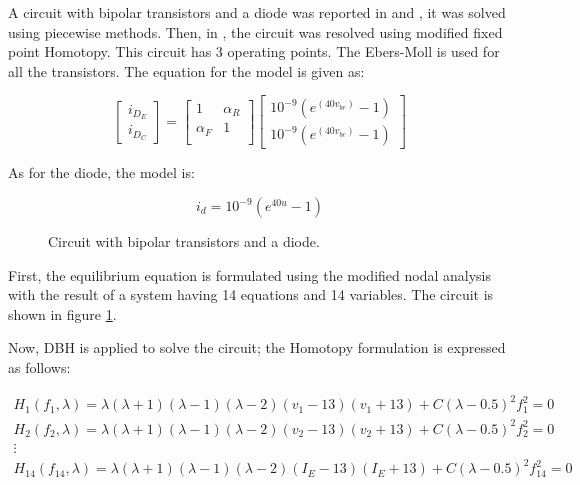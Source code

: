 \documentclass[conference,letterpaper,onecolumn]{IEEEtran}
\begin{document}
A circuit with bipolar transistors and a diode was reported in \cite{homo_tadeusiewicz} and  \cite{homo_yamamurawise}, it was solved using piecewise methods. Then, in \cite{homo_yamamura}, the circuit was resolved using modified fixed point Homotopy. This circuit has 3 operating points. The Ebers-Moll is used for all the transistors. The equation for the model is given as:

\begin{displaymath}
\left[ \begin{array}{c}
i_{D_E} \\
i_{D_C}
\end{array}\right] =
\left[ \begin{array}{cc} 1  & \alpha_R \\
\alpha_F & 1 \\
\end{array}\right] \left[ \begin{array}{c}
10^{-9}(e^{(40v_{be})} - 1) \\
10^{-9}(e^{(40v_{bc})} - 1)
\end{array}\right]
\end{displaymath}

As for the diode, the model is:

\begin{displaymath}
i_d=10^{-9}(e^{40u} - 1)
\end{displaymath}

\begin{figure}[hbtp]
\centerline{
\epsfxsize=95mm
\hspace{3mm}
\epsfxsize=30mm
}
\caption{Circuit with bipolar transistors and a diode.}
\label{yamamuracircuito}
\end{figure}

First, the equilibrium equation is formulated using the modified nodal analysis with the result of a system having 14 equations and 14 variables. The circuit is shown in figure \ref{yamamuracircuito}.


Now, DBH is applied to solve the circuit; the Homotopy formulation is expressed as follows:

\begin{displaymath}
\begin{array}{c}
H_1(f_1,\lambda)=\lambda(\lambda+1)(\lambda-1)(\lambda-2)(v_1-13)(v_1+13)+C(\lambda-0.5)^2 f_1^2=0\\
H_2(f_2,\lambda)=\lambda(\lambda+1)(\lambda-1)(\lambda-2)(v_2-13)(v_2+13)+C(\lambda-0.5)^2 f_2^2=0\\
\vdots \\
H_{14}(f_{14},\lambda)=\lambda(\lambda+1)(\lambda-1)(\lambda-2)(I_E-13)(I_E+13)+C(\lambda-0.5)^2 f_{14}^2=0\\
\end{array}
\end{displaymath}
\end{document}
